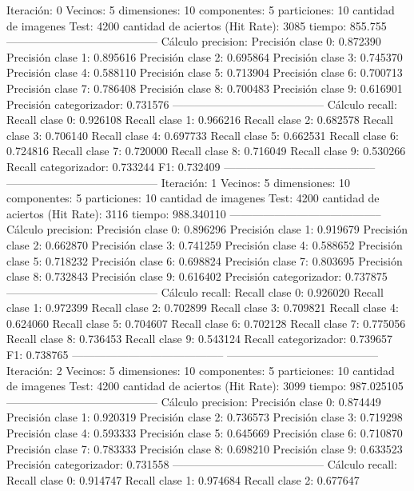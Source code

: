 Iteración: 0
Vecinos: 5
dimensiones: 10
componentes: 5
particiones: 10
cantidad de imagenes Test: 4200
cantidad de aciertos (Hit Rate): 3085
tiempo: 855.755
-----------------------------------------
Cálculo precision: 
Precisión clase 0: 0.872390
Precisión clase 1: 0.895616
Precisión clase 2: 0.695864
Precisión clase 3: 0.745370
Precisión clase 4: 0.588110
Precisión clase 5: 0.713904
Precisión clase 6: 0.700713
Precisión clase 7: 0.786408
Precisión clase 8: 0.700483
Precisión clase 9: 0.616901
Precisión categorizador: 0.731576
-----------------------------------------
Cálculo recall: 
Recall clase 0: 0.926108
Recall clase 1: 0.966216
Recall clase 2: 0.682578
Recall clase 3: 0.706140
Recall clase 4: 0.697733
Recall clase 5: 0.662531
Recall clase 6: 0.724816
Recall clase 7: 0.720000
Recall clase 8: 0.716049
Recall clase 9: 0.530266
Recall categorizador: 0.733244
F1: 0.732409
-----------------------------------------
-----------------------------------------
Iteración: 1
Vecinos: 5
dimensiones: 10
componentes: 5
particiones: 10
cantidad de imagenes Test: 4200
cantidad de aciertos (Hit Rate): 3116
tiempo: 988.340110
-----------------------------------------
Cálculo precision: 
Precisión clase 0: 0.896296
Precisión clase 1: 0.919679
Precisión clase 2: 0.662870
Precisión clase 3: 0.741259
Precisión clase 4: 0.588652
Precisión clase 5: 0.718232
Precisión clase 6: 0.698824
Precisión clase 7: 0.803695
Precisión clase 8: 0.732843
Precisión clase 9: 0.616402
Precisión categorizador: 0.737875
-----------------------------------------
Cálculo recall: 
Recall clase 0: 0.926020
Recall clase 1: 0.972399
Recall clase 2: 0.702899
Recall clase 3: 0.709821
Recall clase 4: 0.624060
Recall clase 5: 0.704607
Recall clase 6: 0.702128
Recall clase 7: 0.775056
Recall clase 8: 0.736453
Recall clase 9: 0.543124
Recall categorizador: 0.739657
F1: 0.738765
-----------------------------------------
-----------------------------------------
Iteración: 2
Vecinos: 5
dimensiones: 10
componentes: 5
particiones: 10
cantidad de imagenes Test: 4200
cantidad de aciertos (Hit Rate): 3099
tiempo: 987.025105
-----------------------------------------
Cálculo precision: 
Precisión clase 0: 0.874449
Precisión clase 1: 0.920319
Precisión clase 2: 0.736573
Precisión clase 3: 0.719298
Precisión clase 4: 0.593333
Precisión clase 5: 0.645669
Precisión clase 6: 0.710870
Precisión clase 7: 0.783333
Precisión clase 8: 0.698210
Precisión clase 9: 0.633523
Precisión categorizador: 0.731558
-----------------------------------------
Cálculo recall: 
Recall clase 0: 0.914747
Recall clase 1: 0.974684
Recall clase 2: 0.677647
